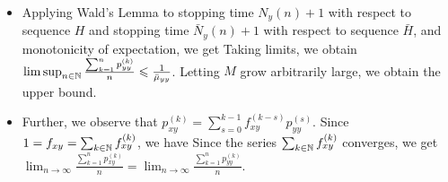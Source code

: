 \documentclass[12pt,aspectratio=169]{beamer}
\begin{document}
\begin{frame}
\begin{Proof}
\begin{itemize}
\item[Upper bound (contd.): ] Applying Wald's Lemma to stopping time $N_y(n)+1$ with respect to \iid sequence $H$ and stopping time $\bar{N}_y(n)+1$ with respect to \iid sequence $\bar{H}$, 
and monotonicity of expectation, we get 
Taking limits, we obtain $\lim\sup_{n \in \mathbb{N}}\frac{\sum_{k=1}^np_{yy}^{(k)}}{n} \leqslant \frac{1}{\bar{\mu}_{yy}}$. 
Letting $M$ grow arbitrarily large, we obtain the upper bound. 
\end{itemize}
\end{Proof}
\end{frame}

\begin{frame}
\begin{Proof}
\begin{itemize}
\item[Starting from $x$: ] Further, we observe that $p_{xy}^{(k)} = \sum_{s=0}^{k-1}f_{xy}^{(k-s)}p_{yy}^{(s)}$.  
Since $1 = f_{xy} = \sum_{k \in \mathbb{N}}f_{xy}^{(k)}$, we have 
Since the series $\sum_{k \in \mathbb{N}}f_{xy}^{(k)}$ converges, we get 
$\lim_{n \to \infty}\frac{\sum_{k=1}^np_{xy}^{(k)}}{n} = \lim_{n \to \infty}\frac{\sum_{k=1}^np_{yy}^{(k)}}{n}. $
\end{itemize}
\end{Proof}
\end{frame}
\end{document}
